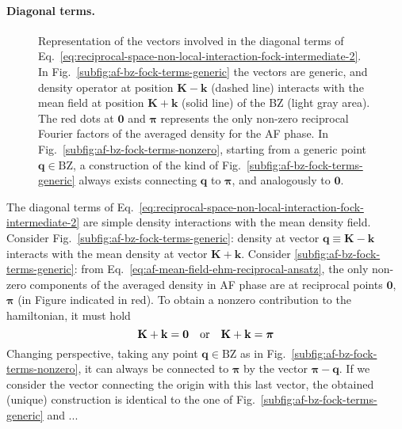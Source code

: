 \paragraph{Diagonal terms.}

\begin{figure}
	\def\Kx{0.5}
	\def\Ky{0.2}
	\def\kx{0.1}
	\def\ky{0.7}
	\centering
	\caption{Representation of the vectors involved in the diagonal terms of Eq.~\eqref{eq:reciprocal-space-non-local-interaction-fock-intermediate-2}. In Fig.~\ref{subfig:af-bz-fock-terms-generic} the vectors are generic, and density operator at position $\mathbf{K}-\mathbf{k}$ (dashed line) interacts with the mean field at position $\mathbf{K}+\mathbf{k}$ (solid line) of the BZ (light gray area). The red dots at $\mathbf{0}$ and $\bm{\pi}$ represents the only non-zero reciprocal Fourier factors of the averaged density for the AF phase. In Fig.~\ref{subfig:af-bz-fock-terms-nonzero}, starting from a generic point $\mathbf{q}\in\mathrm{BZ}$, a construction of the kind of Fig.~\ref{subfig:af-bz-fock-terms-generic} always exists connecting $\mathbf{q}$ to $\bm{\pi}$, and analogously to $\mathbf{0}$.}
	\label{fig:af-bz-fock-terms}
\end{figure}

The diagonal terms of Eq.~\eqref{eq:reciprocal-space-non-local-interaction-fock-intermediate-2} are simple density interactions with the mean density field. Consider Fig.~\ref{subfig:af-bz-fock-terms-generic}: density at vector $\mathbf{q}\equiv\mathbf{K}-\mathbf{k}$ interacts with the mean density at vector $\mathbf{K}+\mathbf{k}$. Consider \ref{subfig:af-bz-fock-terms-generic}: from Eq.~\eqref{eq:af-mean-field-ehm-reciprocal-ansatz}, the only non-zero components of the averaged density in AF phase are at reciprocal points $\mathbf{0}$, $\bm{\pi}$ (in Figure indicated in red). To obtain a nonzero contribution to the hamiltonian, it must hold
\[
	\mathbf{K}+\mathbf{k}=\mathbf{0}
	\qq{or}
	\mathbf{K}+\mathbf{k}=\bm{\pi}
\]
Changing perspective, taking any point $\mathbf{q}\in\mathrm{BZ}$ as in Fig.~\ref{subfig:af-bz-fock-terms-nonzero}, it can always be connected to $\bm{\pi}$ by the vector $\bm{\pi}-\mathbf{q}$. If we consider the vector connecting the origin with this last vector, the obtained (unique) construction is identical to the one of Fig.~\ref{subfig:af-bz-fock-terms-generic} and ...

